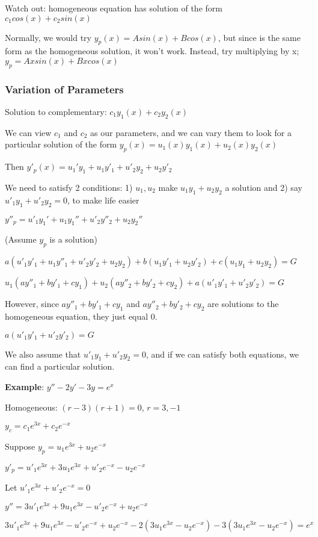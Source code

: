 \documentclass{article}
\begin{document}
Watch out: homogeneous equation has solution of the form $c_1 cos(x)+c_2 sin(x)$

Normally, we would try $y_p(x)=A sin(x) + B cos(x)$, but since is the same form as the homogeneous solution, it won't work. Instead, try multiplying by x; $y_p=Ax sin(x)+Bx cos(x)$

\subsubsection{Variation of Parameters}

Solution to complementary: $c_1 y_1(x)+c_2 y_2(x)$

We can view $c_1$ and $c_2$ as our parameters, and we can vary them to look for a particular solution of the form $y_p(x)=u_1 (x) y_1(x) + u_2(x) y_2(x)$

Then $y'_p(x)=u_1'y_1+u_1 y'_1+u'_2 y_2+u_2 y'_2$

We need to satisfy 2 conditions: 1) $u_1, u_2$ make $u_1 y_1+u_2 y_2$ a solution and 2) say $u'_1 y_1+u'_2 y_2=0$, to make life easier

$y''_p = u'_1y_1'+u_1 y_1''+u'_2 y''_2+u_2 y_2''$

(Assume $y_p$ is a solution)

$a(u'_1 y'_1+u_1 y''_1+u'_2 y'_2+u_2 y_2)+b(u_1 y'_1+u_2 y'_2)+c(u_1 y_1 + u_2 y_2) = G$

$u_1(ay''_1+by'_1+cy_1) + u_2(ay''_2+by'_2+cy_2)+a(u'_1y'_1+u'_2 y'_2)= G$

However, since $ay''_1+by'_1+cy_1$ and $ay''_2+by'_2+cy_2$ are solutions to the homogeneous equation, they just equal 0.

$a(u'_1y'_1+u'_2y'_2)=G$

We also assume that $u'_1 y_1+u'_2 y_2=0$, and if we can satisfy both equations, we can find a particular solution.

\textbf{Example}: $y''-2y'-3y=e^x$

Homogeneous: $(r-3)(r+1)=0$, $r=3,-1$

$y_c = c_1 e^{3x}+c_2 e^{-x}$

Suppose $y_p = u_1 e^{3x}+u_2 e^{-x}$

$y'_p = u'_1 e^{3x}+3u_1 e^{3x}+u'_2 e^{-x}-u_2e^{-x}$

Let $u'_1 e^{3x}+u'_2 e^{-x}=0$

$y'' = 3u'_1 e^{3x}+9u_1 e^{3x}-u'_2 e^{-x}+u_2 e^{-x}$

$3u'_1 e^{3x}+9u_1 e^{3x}-u'_2 e^{-x}+u_2 e^{-x}-2(3u_1 e^{3x}-u_2 e^{-x})-3(3u_1 e^{3x}-u_2 e^{-x})=e^{x}$
\end{document}
